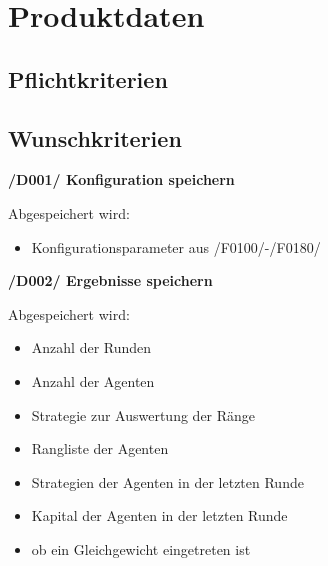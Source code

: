 \section{Produktdaten}

\subsection{Pflichtkriterien}

\subsection{Wunschkriterien}

\textbf{/D001/ Konfiguration speichern}

Abgespeichert wird:
\begin{itemize}
\item Konfigurationsparameter aus /F0100/-/F0180/
\end{itemize}

\textbf{/D002/ Ergebnisse speichern}	

Abgespeichert wird:
\begin{itemize}
\item Anzahl der Runden
\item Anzahl der Agenten
\item Strategie zur Auswertung der Ränge
\item Rangliste der Agenten
\item Strategien der Agenten in der letzten Runde
\item Kapital der Agenten in der letzten Runde
\item ob ein Gleichgewicht eingetreten ist
\end{itemize}